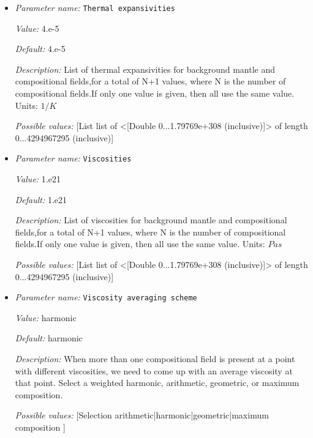 \begin{itemize}
{\it Value:} 4.7


{\it Default:} 4.7


{\it Description:} List of thermal conductivities for background mantle and compositional fields,for a total of N+1 values, where N is the number of compositional fields.If only one value is given, then all use the same value. Units: $W/m/K$ 


{\it Possible values:} [List list of <[Double 0...1.79769e+308 (inclusive)]> of length 0...4294967295 (inclusive)]
\item {\it Parameter name:} {\tt Thermal expansivities}
\label{parameters:Material model/Multicomponent/Thermal expansivities}


{\it Value:} 4.e-5


{\it Default:} 4.e-5


{\it Description:} List of thermal expansivities for background mantle and compositional fields,for a total of N+1 values, where N is the number of compositional fields.If only one value is given, then all use the same value. Units: $1/K$


{\it Possible values:} [List list of <[Double 0...1.79769e+308 (inclusive)]> of length 0...4294967295 (inclusive)]
\item {\it Parameter name:} {\tt Viscosities}
\label{parameters:Material model/Multicomponent/Viscosities}


{\it Value:} 1.e21


{\it Default:} 1.e21


{\it Description:} List of viscosities for background mantle and compositional fields,for a total of N+1 values, where N is the number of compositional fields.If only one value is given, then all use the same value. Units: $Pa s$


{\it Possible values:} [List list of <[Double 0...1.79769e+308 (inclusive)]> of length 0...4294967295 (inclusive)]
\item {\it Parameter name:} {\tt Viscosity averaging scheme}
\label{parameters:Material model/Multicomponent/Viscosity averaging scheme}


{\it Value:} harmonic


{\it Default:} harmonic


{\it Description:} When more than one compositional field is present at a point with different viscosities, we need to come up with an average viscosity at that point.  Select a weighted harmonic, arithmetic, geometric, or maximum composition.


{\it Possible values:} [Selection arithmetic|harmonic|geometric|maximum composition ]
\end{itemize}

